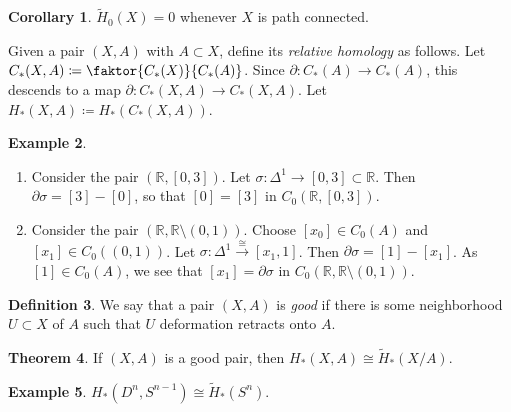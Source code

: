 \documentclass[10pt,letterpaper,cm]{nupset}
\theoremstyle{definition}
\newtheorem{definition}{Definition}[subsection]
\newtheorem{exmp}[definition]{Example}
\theoremstyle{theorem}
\newtheorem{theorem}[definition]{Theorem}
\newtheorem{corollary}[definition]{Corollary}
\theoremstyle{remark}
\newcommand{\R}{\mathbb{R}}
\newcommand{\1}{\mathbb{1}}
\newcommand{\0}{\vec 0}
\begin{document}
\begin{corollary}\label{c10}
$\widetilde{H}_0(X)=0$ whenever $X$ is path connected. 
\end{corollary}


Given a pair $\left(X,A\right)$ with $A\subset X$, define its \textit{relative homology} as follows. Let $C_{\ast}(X,A) \coloneqq \faktor{C_{\ast}(X)}{C_{\ast}(A)}$. Since $\partial : C_{\ast}(A) \to C_{\ast}(A)$, this descends to a map $\partial : C_{\ast}(X,A) \to C_{\ast}(X,A)$. Let $ H_{\ast}(X,A) \coloneqq H_{\ast}(C_{\ast}(X,A))   .$

\begin{exmp} $ $
\begin{enumerate}
\item Consider the pair $\left(\R, \left[0,3\right]\right)$. Let $\sigma : \Delta^1 \to [0,3]\subset \R$. Then $\partial{\sigma} = \left[3\right] -\left[0\right]$, so that $\left[0\right] = \left[3\right]$ in $C_0(\R, \left[0,3\right])$.
\item Consider the pair $\left(\R, \R \setminus \left(0,1\right)\right)$. Choose $\left[x_0\right] \in C_0(A)$ and $\left[x_1\right] \in C_0((0,1))$. Let $\sigma : \Delta^1 \overset{\cong}{\longrightarrow} \left[x_1, 1\right]$. Then $\partial{\sigma} = \left[1\right] -\left[x_1\right]$. As $\left[1\right]\in C_0(A)$, we see that $\left[x_1\right] = \partial{\sigma}$ in $C_0(\R, \R\setminus \left(0,1\right))$.
\end{enumerate}
\end{exmp}

\begin{definition}
We say that a pair $\left(X, A\right)$ is \textit{good} if there is some neighborhood $U\subset X$ of $A$ such that $U$ deformation retracts onto $A$.
\end{definition}

\begin{theorem}
If $\left(X,A\right)$ is a good pair, then $H_{\ast}(X,A) \cong \widetilde{H}_{\ast}(X/A)$.
\end{theorem}

\begin{exmp}
$H_{\ast}(D^n, S^{n-1}) \cong \widetilde{H}_{\ast}(S^n)$.
\end{exmp}
\end{document}
